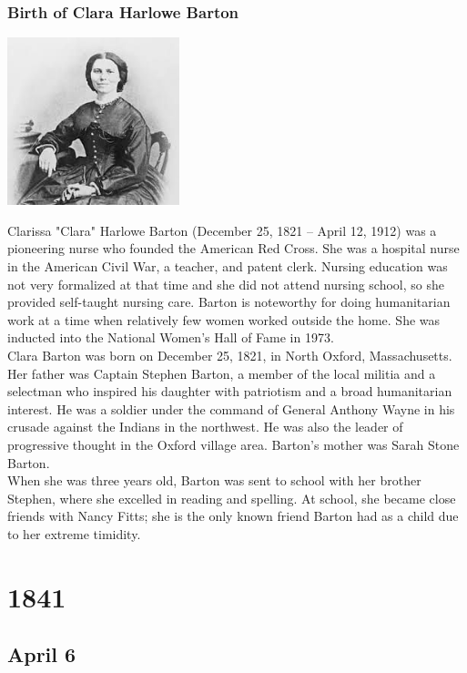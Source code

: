 \documentclass[11pt]{report}
\begin{document}
\subsection{Birth of Clara Harlowe Barton}
\vspace{2mm}\begin{center}\includegraphics[width=5cm]{./img/claraBarton.jpg}\end{center}
Clarissa "Clara" Harlowe Barton (December 25, 1821 – April 12, 1912) was a pioneering nurse who founded the American Red Cross. She was a hospital nurse in the American Civil War, a teacher, and patent clerk. Nursing education was not very formalized at that time and she did not attend nursing school, so she provided self-taught nursing care. Barton is noteworthy for doing humanitarian work at a time when relatively few women worked outside the home. She was inducted into the National Women's Hall of Fame in 1973.\\ \indent Clara Barton was born on December 25, 1821, in North Oxford, Massachusetts. Her father was Captain Stephen Barton, a member of the local militia and a selectman who inspired his daughter with patriotism and a broad humanitarian interest. He was a soldier under the command of General Anthony Wayne in his crusade against the Indians in the northwest. He was also the leader of progressive thought in the Oxford village area. Barton's mother was Sarah Stone Barton.\\
\indent When she was three years old, Barton was sent to school with her brother Stephen, where she excelled in reading and spelling. At school, she became close friends with Nancy Fitts; she is the only known friend Barton had as a child due to her extreme timidity.

\chapter{1841}
\section{April 6}
\end{document}
